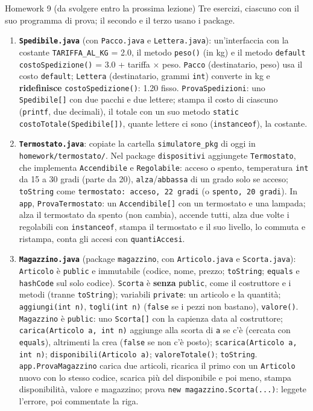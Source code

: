 \documentclass[10pt,aspectratio=169]{beamer}
\begin{document}
\begin{frame}{Homework 9 (da svolgere entro la prossima lezione)}
\footnotesize\setlength{\parskip}{0pt}\vspace{-0.15cm}
Tre esercizi, ciascuno con il suo programma di prova; il secondo e il terzo usano i package.
\begin{enumerate}\itemsep=1pt
    \item \textbf{\texttt{Spedibile.java}} (con \texttt{Pacco.java} e \texttt{Lettera.java}): un'interfaccia con la costante \texttt{TARIFFA\_AL\_KG} = 2.0, il metodo \texttt{peso()} (in kg) e il metodo \texttt{default} \texttt{costoSpedizione()} = 3.0 + tariffa $\times$ peso. \texttt{Pacco} (destinatario, peso) usa il costo \texttt{default}; \texttt{Lettera} (destinatario, grammi \texttt{int}) converte in kg e \textbf{ridefinisce} \texttt{costoSpedizione()}: 1.20 fisso. \texttt{ProvaSpedizioni}: uno \texttt{Spedibile[]} con due pacchi e due lettere; stampa il costo di ciascuno (\texttt{printf}, due decimali), il totale con un suo metodo \texttt{static} \texttt{costoTotale(Spedibile[])}, quante lettere ci sono (\texttt{instanceof}), la costante.
    \item \textbf{\texttt{Termostato.java}}: copiate la cartella \texttt{simulatore\_pkg} di oggi in \texttt{homework/termostato/}. Nel package \texttt{dispositivi} aggiungete \texttt{Termostato}, che implementa \texttt{Accendibile} e \texttt{Regolabile}: acceso o spento, temperatura \texttt{int} da 15 a 30 gradi (parte da 20), \texttt{alza}/\texttt{abbassa} di un grado solo se acceso; \texttt{toString} come \texttt{termostato: acceso, 22 gradi} (o \texttt{spento, 20 gradi}). In \texttt{app}, \texttt{ProvaTermostato}: un \texttt{Accendibile[]} con un termostato e una lampada; alza il termostato da spento (non cambia), accende tutti, alza due volte i regolabili con \texttt{instanceof}, stampa il termostato e il suo livello, lo commuta e ristampa, conta gli accesi con \texttt{quantiAccesi}.
    \item \textbf{\texttt{Magazzino.java}} (package \texttt{magazzino}, con \texttt{Articolo.java} e \texttt{Scorta.java}): \texttt{Articolo} è \texttt{public} e immutabile (codice, nome, prezzo; \texttt{toString}; \texttt{equals} e \texttt{hashCode} sul solo codice). \texttt{Scorta} è \textbf{senza} \texttt{public}, come il costruttore e i metodi (tranne \texttt{toString}); variabili \texttt{private}: un articolo e la quantità; \texttt{aggiungi(int n)}, \texttt{togli(int n)} (\texttt{false} se i pezzi non bastano), \texttt{valore()}. \texttt{Magazzino} è \texttt{public}: uno \texttt{Scorta[]} con la capienza data al costruttore; \texttt{carica(Articolo a, int n)} aggiunge alla scorta di \texttt{a} se c'è (cercata con \texttt{equals}), altrimenti la crea (\texttt{false} se non c'è posto); \texttt{scarica(Articolo a, int n)}; \texttt{disponibili(Articolo a)}; \texttt{valoreTotale()}; \texttt{toString}. \texttt{app.ProvaMagazzino} carica due articoli, ricarica il primo con un \texttt{Articolo} nuovo con lo stesso codice, scarica più del disponibile e poi meno, stampa disponibilità, valore e magazzino; prova \texttt{new magazzino.Scorta(...)}: leggete l'errore, poi commentate la riga.

\end{enumerate}
\end{frame}
\end{document}

